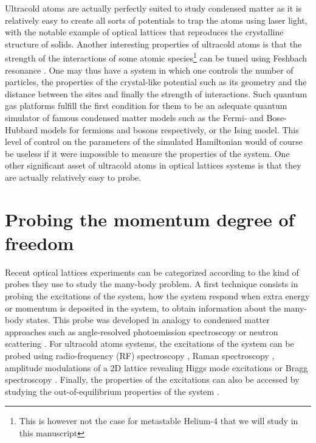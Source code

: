 Ultracold atoms are actually perfectly suited to study condensed matter as it is relatively easy to create all sorts of potentials to trap the atoms using laser light, with the notable example of optical lattices \cite{bloch2005ultracold} that reproduces the crystalline structure of solids. Another interesting properties of ultracold atoms is that the strength of the interactions of some atomic species\footnote{This is however not the case for metastable Helium-4 that we will study in this manuscript} can be tuned using Feshbach resonance \cite{chin2010feshbach,feshbach1958unified}. One may thus have a system in which one controls the number of particles, the properties of the crystal-like potential such as its geometry and the distance between the sites and finally the strength of interactions. Such quantum gas platforms fulfill the first condition for them to be an adequate quantum simulator of famous condensed matter models such as the Fermi- and Bose-Hubbard models for fermions and bosons respectively, or the Ising model. This level of control on the parameters of the simulated Hamiltonian would of course be useless if it were impossible to measure the properties of the system. One other significant asset of ultracold atoms in optical lattices systems is that they are actually relatively easy to probe.

\section*{Probing the momentum degree of freedom}

Recent optical lattices experiments can be categorized according to the kind of probes they use to study the many-body problem. A first technique consists in probing the excitations of the system, \ie how the system respond when extra energy or momentum is deposited in the system, to obtain information about the many-body states. This probe was developed in analogy to condensed matter approaches such as angle-resolved photoemission spectroscopy \cite{damascelli2003angle} or neutron scattering \cite{ashcroft1976solid}. For ultracold atoms systems, the excitations of the system can be probed using radio-frequency (RF) spectroscopy \cite{stewart2008using}, Raman spectroscopy \cite{dao2007measuring}, amplitude modulations of a 2D lattice revealing Higgs mode excitations \cite{endres2012higgs} or Bragg spectroscopy \cite{sobirey2021observation,steinhauer2002excitation}. Finally, the properties of the excitations can also be accessed by studying the out-of-equilibrium properties of the system \cite{keesling2019quantum,villa2019unraveling}.

